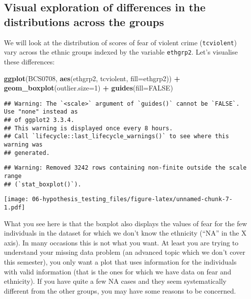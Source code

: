 \documentclass[
]{book}
\newenvironment{Shaded}{\begin{snugshade}}{\end{snugshade}}
\newcommand{\AttributeTok}[1]{\textcolor[rgb]{0.13,0.29,0.53}{#1}}
\newcommand{\ConstantTok}[1]{\textcolor[rgb]{0.56,0.35,0.01}{#1}}
\newcommand{\DecValTok}[1]{\textcolor[rgb]{0.00,0.00,0.81}{#1}}
\newcommand{\FunctionTok}[1]{\textcolor[rgb]{0.13,0.29,0.53}{\textbf{#1}}}
\newcommand{\NormalTok}[1]{#1}
\newcommand{\SpecialCharTok}[1]{\textcolor[rgb]{0.81,0.36,0.00}{\textbf{#1}}}
\begin{document}
\subsection{Visual exploration of differences in the distributions across the groups}\label{visual-exploration-of-differences-in-the-distributions-across-the-groups}

We will look at the distribution of scores of fear of violent crime (\texttt{tcviolent}) vary across the ethnic groups indexed by the variable \texttt{ethgrp2}. Let's visualise these differences:

\begin{Shaded}
\begin{Highlighting}[]
\FunctionTok{ggplot}\NormalTok{(BCS0708, }\FunctionTok{aes}\NormalTok{(ethgrp2, tcviolent, }\AttributeTok{fill=}\NormalTok{ethgrp2)) }\SpecialCharTok{+} 
  \FunctionTok{geom\_boxplot}\NormalTok{(}\AttributeTok{outlier.size=}\DecValTok{1}\NormalTok{) }\SpecialCharTok{+} 
  \FunctionTok{guides}\NormalTok{(}\AttributeTok{fill=}\ConstantTok{FALSE}\NormalTok{) }
\end{Highlighting}
\end{Shaded}

\begin{verbatim}
## Warning: The `<scale>` argument of `guides()` cannot be `FALSE`. Use "none" instead as
## of ggplot2 3.3.4.
## This warning is displayed once every 8 hours.
## Call `lifecycle::last_lifecycle_warnings()` to see where this warning was
## generated.
\end{verbatim}

\begin{verbatim}
## Warning: Removed 3242 rows containing non-finite outside the scale range
## (`stat_boxplot()`).
\end{verbatim}

\texttt{[image: 06-hypothesis\_testing\_files/figure-latex/unnamed-chunk-7-1.pdf]}

What you see here is that the boxplot also displays the values of fear for the few individuals in the dataset for which we don't know the ethnicity (``NA'' in the X axis). In many occasions this is not what you want. At least you are trying to understand your missing data problem (an advanced topic which we don't cover this semester), you only want a plot that uses information for the individuals with valid information (that is the ones for which we have data on fear and ethnicity). If you have quite a few NA cases and they seem systematically different from the other groups, you may have some reasons to be concerned.
\end{document}
